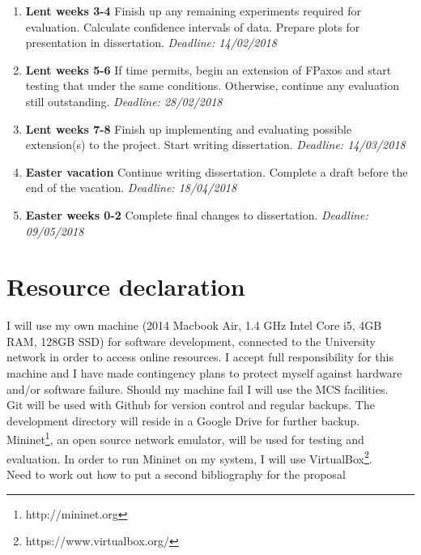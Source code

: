 \begin{enumerate}
  \item {\bf{}Lent weeks 3-4} Finish up any remaining experiments required for evaluation. Calculate confidence intervals of data. Prepare plots for presentation in dissertation.{\em{} Deadline: 14/02/2018}
  
    \item {\bf{}Lent weeks 5-6} If time permits, begin an extension of FPaxos and start testing that under the same conditions. Otherwise, continue any evaluation still outstanding.{\em{} Deadline: 28/02/2018}

  \item {\bf{}Lent weeks 7-8} Finish up implementing and evaluating possible extension(s) to the project. Start writing dissertation.{\em{} Deadline: 14/03/2018}
  
  \item {\bf{}Easter vacation} Continue writing dissertation. Complete a draft before the end of the vacation.{\em{} Deadline: 18/04/2018}
  
  \item {\bf{}Easter weeks 0-2} Complete final changes to dissertation.{\em{} Deadline: 09/05/2018}
\end{enumerate}

\section*{Resource declaration}
I will use my own machine (2014 Macbook Air, 1.4 GHz Intel Core i5, 4GB RAM, 128GB SSD) for software development, connected to the University network in order to access online resources. I accept full responsibility for this machine and I have made contingency plans to protect myself against hardware and/or software failure. Should my machine fail I will use the MCS facilities.  \\

Git will be used with Github for version control and regular backups. The development directory will reside in a Google Drive for further backup. \\

Mininet\footnote{http://mininet.org}, an open source network emulator, will be used for testing and evaluation. In order to run Mininet on my system, I will use VirtualBox\footnote{https://www.virtualbox.org/}. \\

{\color{red} Need to work out how to put a second bibliography for the proposal}

%
% 